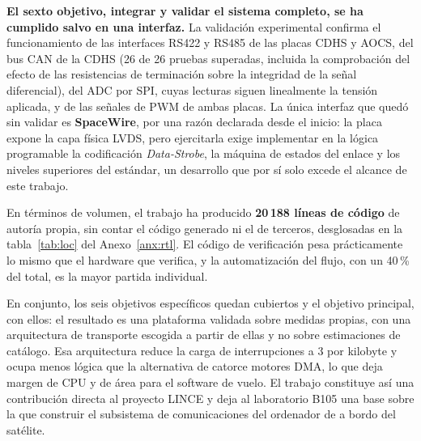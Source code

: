 \textbf{El sexto objetivo, integrar y validar el sistema completo, se ha cumplido salvo en una
interfaz.} La validación experimental confirma el funcionamiento de las interfaces RS422 y RS485 de
las placas CDHS y AOCS, del bus CAN de la CDHS (26 de 26 pruebas superadas, incluida la
comprobación del efecto de las resistencias de terminación sobre la integridad de la señal
diferencial), del ADC por SPI, cuyas lecturas siguen linealmente la tensión aplicada, y de las
señales de PWM de ambas placas. La única interfaz que quedó sin validar es \textbf{SpaceWire}, por
una razón declarada desde el inicio: la placa expone la capa física LVDS, pero ejercitarla exige
implementar en la lógica programable la codificación \textit{Data-Strobe}, la máquina de estados
del enlace y los niveles superiores del estándar, un desarrollo que por sí solo excede el alcance
de este trabajo.

En términos de volumen, el trabajo ha producido \textbf{20\,188 líneas de código} de autoría propia,
sin contar el código generado ni el de terceros, desglosadas en la tabla~\ref{tab:loc} del
Anexo~\ref{anx:rtl}. El código de verificación pesa prácticamente lo mismo que el hardware que
verifica, y la automatización del flujo, con un 40\,\% del total, es la mayor partida individual.

En conjunto, los seis objetivos específicos quedan cubiertos y el objetivo principal, con ellos: el
resultado es una plataforma validada sobre medidas propias, con una arquitectura de transporte
escogida a partir de ellas y no sobre estimaciones de catálogo. Esa arquitectura reduce la carga de
interrupciones a 3 por kilobyte y ocupa menos lógica que la alternativa de catorce motores DMA, lo
que deja margen de CPU y de área para el software de vuelo. El trabajo constituye así una
contribución directa al proyecto LINCE y deja al laboratorio B105 una base sobre la que construir
el subsistema de comunicaciones del ordenador de a bordo del satélite.
